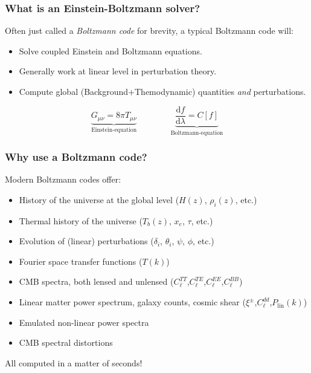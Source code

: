 \begin{frame}[fragile]
	\frametitle{What is an Einstein-Boltzmann solver?}

	Often just called a \emph{Boltzmann code} for brevity, a typical Boltzmann code will:
	\vspace{0.5\baselineskip}
	\begin{itemize}
		\item Solve coupled Einstein and Boltzmann equations.\\
		\item Generally work at linear level in perturbation theory. \\
		\item Compute global (Background+Themodynamic) quantities \emph{and} perturbations.
	\end{itemize}

	\begin{equation}
		\underbrace{G_{\mu \nu} = 8 \pi T_{\mu \nu}}_{\text{Einstein-equation}} \qquad \qquad \underbrace{\frac{\mathrm{d} f}{\mathrm{d} \lambda} = C[f]}_{\text{Boltzmann-equation}}
	\end{equation}

\end{frame}

\begin{frame}[fragile]
	\frametitle{Why use a Boltzmann code?}
	Modern Boltzmann codes offer:
	\vspace{0.5\baselineskip}
	\begin{itemize}
		\item History of the universe at the global level ($H(z)$, $\rho_i(z)$, etc.) \pause
		\item Thermal history of the universe ($T_b(z)$, $x_e$, $\tau$, etc.) \pause
		\item Evolution of (linear) perturbations ($\delta_i$, $\theta_i$, $\psi$, $\phi$, etc.) \pause
		\item Fourier space transfer functions ($T(k)$) \pause
		\item CMB spectra, both lensed and unlensed ($C_\ell^{TT}$,$C_\ell^{TE}$,$C_\ell^{EE}$,$C_\ell^{BB}$) \pause
		\item Linear matter power spectrum, galaxy counts, cosmic shear ($\xi^\pm$,$C_\ell^{dd}$,$P_\mathrm{lin}(k)$) \pause
		\item Emulated non-linear power spectra \pause
		\item CMB spectral distortions \pause
	\end{itemize}
	All computed in a matter of seconds!

\end{frame}

